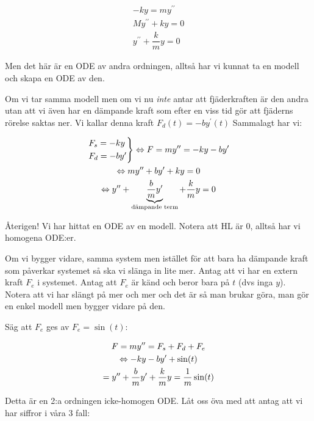 \begin{equation*}
  \begin{gathered}
    -ky = my^{\prime\prime}\\
    My^{\prime\prime}+ky=0\\
    y^{\prime\prime}+\dfrac{k}{m}y=0
  \end{gathered}
\end{equation*}
\par\bigskip
\noindent Men det här är en ODE av andra ordningen, alltså har vi kunnat ta en modell och skapa en ODE av den.
\par\bigskip
\noindent Om vi tar samma modell men om vi nu \textit{inte} antar att fjäderkraften är den andra utan att vi även har en dämpande kraft som efter en viss tid gör att fjäderns rörelse saktas ner. Vi kallar denna kraft $F_d(t)=-by^{\prime}(t)$ Sammalagt har vi:

\begin{equation*}
  \begin{gathered}
    \begin{rcases*}
    F_s = -ky\\
    F_d = -by^{\prime}\\
    \end{rcases*}\Lrarr F=my^{\prime\prime} = -ky-by^{\prime}\\
    \Lrarr my^{\prime\prime}+by^{\prime}+ky=0\\
    \Lrarr y^{\prime\prime}+\underbrace{\dfrac{b}{m}y^{\prime}}_{\text{dämpande term}}+\dfrac{k}{m}y=0
  \end{gathered}
\end{equation*}
\par\bigskip
\noindent Återigen! Vi har hittat en ODE av en modell. Notera att HL är 0, alltså har vi homogena ODE:er.
\par\bigskip
\noindent Om vi bygger vidare, samma system men istället för att bara ha dämpande kraft som påverkar systemet så ska vi slänga in lite mer. Antag att vi har en extern kraft $F_e$ i systemet. Antag att $F_e$ är känd och beror bara på $t$ (dvs inga $y$). Notera att vi har slängt på mer och mer och  det är så man brukar göra, man gör en enkel modell men bygger vidare på den.
\par\bigskip
\noindent Säg att $F_e$ ges av $F_e = \sin(t)$:

\begin{equation*}
  \begin{gathered}
    F = my^{\prime\prime} = F_s+F_d+F_e\\
    \Leftrightarrow -ky-by^{\prime}+\sin(t)\\
    = y^{\prime\prime}+\dfrac{b}{m}y^{\prime}+\dfrac{k}{m}y=\dfrac{1}{m}\sin(t)
  \end{gathered}
\end{equation*}
\par\bigskip
\noindent Detta är en 2:a ordningen icke-homogen ODE. Låt oss öva med att antag att vi har siffror i våra 3 fall:

